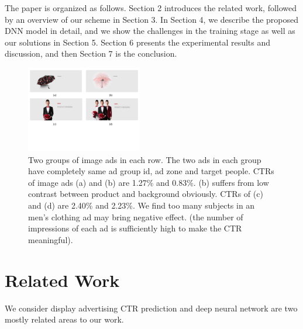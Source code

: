 \documentclass{sig-alternate-05-2015}
\begin{document}
The paper is organized as follows. Section 2 introduces the related work, followed by an overview of our scheme in Section 3. In Section 4, we describe the proposed DNN model in detail, and we show the challenges in the training stage as well as our solutions  in Section 5. Section 6 presents the experimental results and discussion, and then Section 7 is the conclusion.   
\begin{figure}
	\centering
	\includegraphics[width=0.45\textwidth]{compare}
	\caption{Two groups of image ads in each row. The two ads in each group have completely same ad group id, ad zone and target people. CTRs of image ads (a) and (b) are 1.27\% and 0.83\%. (b) suffers from  low contrast between product and background obviously. CTRs of (c) and (d) are 2.40\% and 2.23\%. We find too many subjects in an men's clothing ad may bring  negative effect. (the number of impressions of each ad is sufficiently high to make the CTR meaningful).}
	\label{fig:compare}
\end{figure}
\section{Related Work}
We consider display advertising CTR prediction and deep neural network are two mostly related areas to our work.
\vfill\eject
\end{document}
